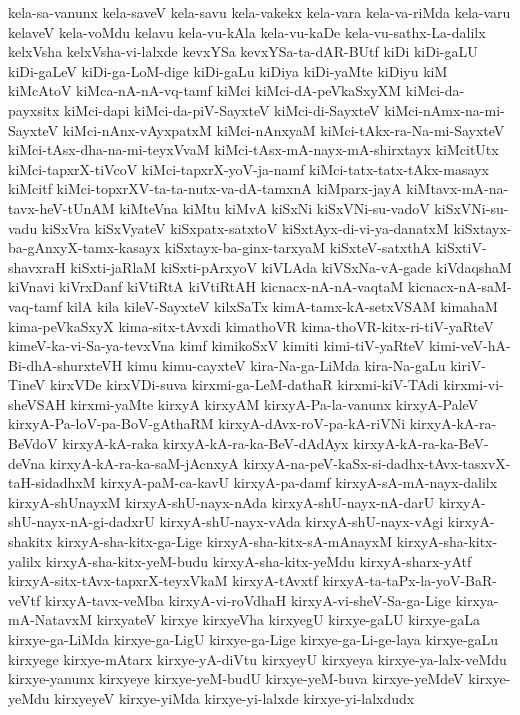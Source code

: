 {kela-sa-vanunx
kela-saveV
kela-savu
kela-vakekx
kela-vara
kela-va-riMda
kela-varu
kelaveV
kela-voMdu
kelavu
kela-vu-kAla
kela-vu-kaDe
kela-vu-sathx-La-dalilx
kelxVsha
kelxVsha-vi-lalxde
kevxYSa
kevxYSa-ta-dAR-BUtf
kiDi
kiDi-gaLU
kiDi-gaLeV
kiDi-ga-LoM-dige
kiDi-gaLu
kiDiya
kiDi-yaMte
kiDiyu
kiM
kiMcAtoV
kiMca-nA-nA-vq-tamf
kiMci
kiMci-dA-peVkaSxyXM
kiMci-da-payxsitx
kiMci-dapi
kiMci-da-piV-SayxteV
kiMci-di-SayxteV
kiMci-nAmx-na-mi-SayxteV
kiMci-nAnx-vAyxpatxM
kiMci-nAnxyaM
kiMci-tAkx-ra-Na-mi-SayxteV
kiMci-tAsx-dha-na-mi-teyxVvaM
kiMci-tAsx-mA-nayx-mA-shirxtayx
kiMcitUtx
kiMci-tapxrX-tiVcoV
kiMci-tapxrX-yoV-ja-namf
kiMci-tatx-tatx-tAkx-masayx
kiMcitf
kiMci-topxrXV-ta-ta-nutx-va-dA-tamxnA
kiMparx-jayA
kiMtavx-mA-na-tavx-heV-tUnAM
kiMteVna
kiMtu
kiMvA
kiSxNi
kiSxVNi-su-vadoV
kiSxVNi-su-vadu
kiSxVra
kiSxVyateV
kiSxpatx-satxtoV
kiSxtAyx-di-vi-ya-danatxM
kiSxtayx-ba-gAnxyX-tamx-kasayx
kiSxtayx-ba-ginx-tarxyaM
kiSxteV-satxthA
kiSxtiV-shavxraH
kiSxti-jaRlaM
kiSxti-pArxyoV
kiVLAda
kiVSxNa-vA-gade
kiVdaqshaM
kiVnavi
kiVrxDanf
kiVtiRtA
kiVtiRtAH
kicnacx-nA-nA-vaqtaM
kicnacx-nA-saM-vaq-tamf
kilA
kila
kileV-SayxteV
kilxSaTx
kimA-tamx-kA-setxVSAM
kimahaM
kima-peVkaSxyX
kima-sitx-tAvxdi
kimathoVR
kima-thoVR-kitx-ri-tiV-yaRteV
kimeV-ka-vi-Sa-ya-tevxVna
kimf
kimikoSxV
kimiti
kimi-tiV-yaRteV
kimi-veV-hA-Bi-dhA-shurxteVH
kimu
kimu-cayxteV
kira-Na-ga-LiMda
kira-Na-gaLu
kiriV-TineV
kirxVDe
kirxVDi-suva
kirxmi-ga-LeM-dathaR
kirxmi-kiV-TAdi
kirxmi-vi-sheVSAH
kirxmi-yaMte
kirxyA
kirxyAM
kirxyA-Pa-la-vanunx
kirxyA-PaleV
kirxyA-Pa-loV-pa-BoV-gAthaRM
kirxyA-dAvx-roV-pa-kA-riVNi
kirxyA-kA-ra-BeVdoV
kirxyA-kA-raka
kirxyA-kA-ra-ka-BeV-dAdAyx
kirxyA-kA-ra-ka-BeV-deVna
kirxyA-kA-ra-ka-saM-jAcnxyA
kirxyA-na-peV-kaSx-si-dadhx-tAvx-tasxvX-taH-sidadhxM
kirxyA-paM-ca-kavU
kirxyA-pa-damf
kirxyA-sA-mA-nayx-dalilx
kirxyA-shUnayxM
kirxyA-shU-nayx-nAda
kirxyA-shU-nayx-nA-darU
kirxyA-shU-nayx-nA-gi-dadxrU
kirxyA-shU-nayx-vAda
kirxyA-shU-nayx-vAgi
kirxyA-shakitx
kirxyA-sha-kitx-ga-Lige
kirxyA-sha-kitx-sA-mAnayxM
kirxyA-sha-kitx-yalilx
kirxyA-sha-kitx-yeM-budu
kirxyA-sha-kitx-yeMdu
kirxyA-sharx-yAtf
kirxyA-sitx-tAvx-tapxrX-teyxVkaM
kirxyA-tAvxtf
kirxyA-ta-taPx-la-yoV-BaR-veVtf
kirxyA-tavx-veMba
kirxyA-vi-roVdhaH
kirxyA-vi-sheV-Sa-ga-Lige
kirxya-mA-NatavxM
kirxyateV
kirxye
kirxyeVha
kirxyegU
kirxye-gaLU
kirxye-gaLa
kirxye-ga-LiMda
kirxye-ga-LigU
kirxye-ga-Lige
kirxye-ga-Li-ge-laya
kirxye-gaLu
kirxyege
kirxye-mAtarx
kirxye-yA-diVtu
kirxyeyU
kirxyeya
kirxye-ya-lalx-veMdu
kirxye-yanunx
kirxyeye
kirxye-yeM-budU
kirxye-yeM-buva
kirxye-yeMdeV
kirxye-yeMdu
kirxyeyeV
kirxye-yiMda
kirxye-yi-lalxde
kirxye-yi-lalxdudx
}
